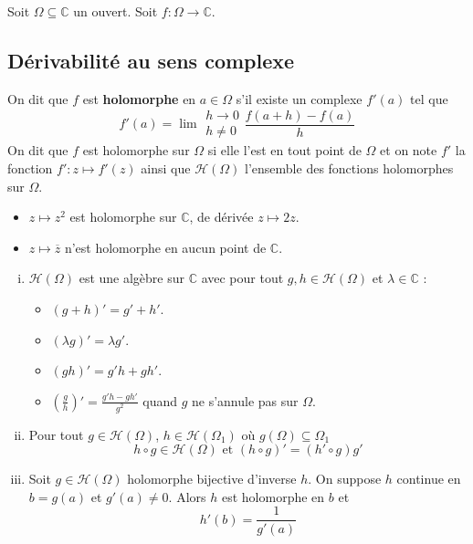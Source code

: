 




	Soit $\Omega \subseteq \mathbb{C}$ un ouvert. Soit $f : \Omega \rightarrow \mathbb{C}$.

	\subsection{Dérivabilité au sens complexe}


	\begin{definition}
		On dit que $f$ est \textbf{holomorphe} en $a \in \Omega$ s'il existe un complexe $f'(a)$ tel que
		\[ f'(a) = \lim{\substack{h \rightarrow 0 \\ h \neq 0}} \frac{f(a+h) - f(a)}{h} \]
		On dit que $f$ est holomorphe sur $\Omega$ si elle l'est en tout point de $\Omega$ et on note $f'$ la fonction $f' : z \mapsto f'(z)$ ainsi que $\mathcal{H}(\Omega)$ l'ensemble des fonctions holomorphes sur $\Omega$.
	\end{definition}

	\begin{example}
		\begin{itemize}
			\item $z \mapsto z^2$ est holomorphe sur $\mathbb{C}$, de dérivée $z \mapsto 2z$.
			\item $z \mapsto \overline{z}$ n'est holomorphe en aucun point de $\mathbb{C}$.
		\end{itemize}
	\end{example}

	\begin{proposition}
		\begin{enumerate}[(i)]
			\item $\mathcal{H}(\Omega)$ est une algèbre sur $\mathbb{C}$ avec pour tout $g, h \in \mathcal{H}(\Omega)$ et $\lambda \in \mathbb{C}$ :
			\begin{itemize}
				\item $(g+h)' = g'+h'$.
				\item $(\lambda g)' = \lambda g'$.
				\item $(gh)' = g'h + gh'$.
				\item $\left( \frac{g}{h} \right)' = \frac{g'h - gh'}{g^2}$ quand $g$ ne s'annule pas sur $\Omega$.
			\end{itemize}
			\item Pour tout $g \in \mathcal{H}(\Omega)$, $h \in \mathcal{H}(\Omega_1)$ où $g(\Omega) \subseteq \Omega_1$
			\[ h \circ g \in \mathcal{H}(\Omega) \text{ et } (h \circ g)' = (h' \circ g) g' \]
			\item Soit $g \in \mathcal{H}(\Omega)$ holomorphe bijective d'inverse $h$. On suppose $h$ continue en $b = g(a)$ et $g'(a) \neq 0$. Alors $h$ est holomorphe en $b$ et
			\[ h'(b) = \frac{1}{g'(a)} \]
		\end{enumerate}
	\end{proposition}

